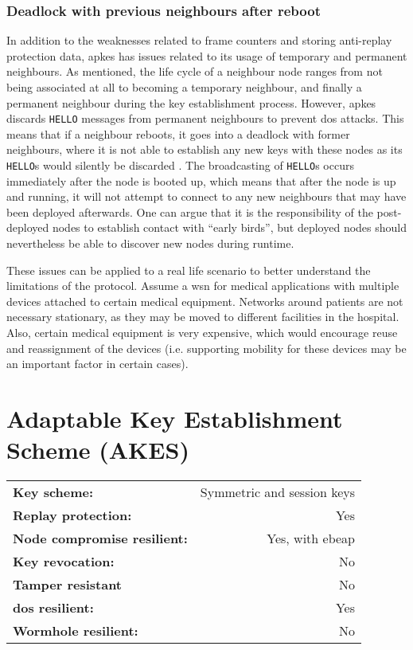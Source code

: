 \subsubsection{Deadlock with previous neighbours after reboot}

In addition to the weaknesses related to frame counters and storing anti-replay protection data, \gls{apkes} has issues related to its usage of temporary and permanent neighbours. As mentioned, the life cycle of a neighbour node ranges from not being associated at all to becoming a temporary neighbour, and finally a permanent neighbour during the key establishment process. However, \gls{apkes} discards \texttt{HELLO} messages from permanent neighbours to prevent \gls{dos} attacks. This means that if a neighbour reboots, it goes into a deadlock with former neighbours, where it is not able to establish any new keys with these nodes as its \texttt{HELLO}s would silently be discarded \cite{krentz2015handling}. The broadcasting of \texttt{HELLO}s occurs immediately after the node is booted up, which means that after the node is up and running, it will not attempt to connect to any new neighbours that may have been deployed afterwards. One can argue that it is the responsibility of the post-deployed nodes to establish contact with ``early birds'', but deployed nodes should nevertheless be able to discover new nodes during runtime. 

These issues can be applied to a real life scenario to better understand the limitations of the protocol. Assume a \gls{wsn} for medical applications with multiple devices attached to certain medical equipment. Networks around patients are not necessary stationary, as they may be moved to different facilities in the hospital. Also, certain medical equipment is very expensive, which would encourage reuse and reassignment of the devices (i.e. supporting mobility for these devices may be an important factor in certain cases). 



\section{Adaptable Key Establishment Scheme (AKES)}


\begin{table}[h]
\begin{tabular}{lr}
\textbf{Key scheme:} & Symmetric and session keys  \\
\textbf{Replay protection:}	 & Yes  \\
\textbf{Node compromise resilient:} & Yes, with \gls{ebeap}  \\
\textbf{Key revocation:} & No \\
\textbf{Tamper resistant} & No \\
\textbf{\gls{dos} resilient:} & Yes \\
\textbf{Wormhole resilient:} & No \\
\end{tabular}
\end{table}

